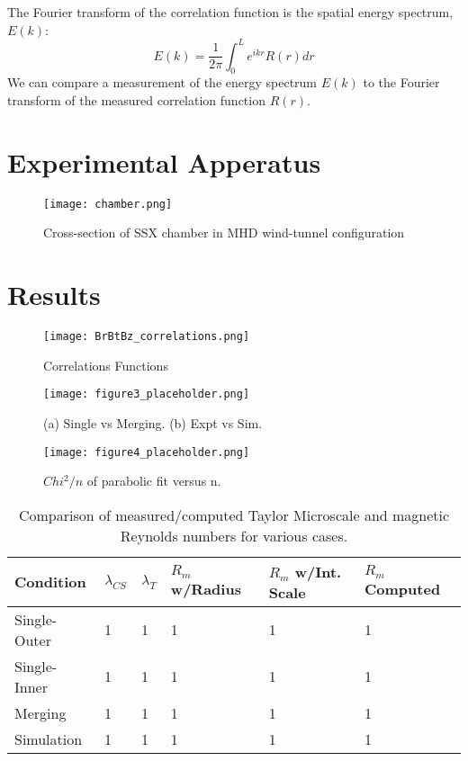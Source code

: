 \documentclass[aip,prl,amsmath,amssymb,reprint,superscriptaddress]{revtex4-1} %
\begin{document}
The Fourier transform of the correlation function is the spatial energy spectrum, $E(k)$:
%
\begin{equation}
E(k) = \frac{1}{2 \pi} \int_0^L e^{ikr} R(r) dr
\label{eq:spectrum1}
\end{equation}
%
We can compare a measurement of the energy spectrum $E(k)$ to the Fourier transform of the measured correlation function $R(r)$.

\section{Experimental Apperatus}

\begin{figure}[!htbp]
\centerline{
\texttt{[image: chamber.png]}}
\caption{\label{fig:chamber} Cross-section of SSX chamber in MHD wind-tunnel configuration}
\end{figure}

\section{Results}

\begin{figure}[!htbp]
\centerline{
\texttt{[image: BrBtBz\_correlations.png]}}
\caption{\label{fig:BrBtBz_correlations} Correlations Functions}
\end{figure}

\begin{figure}[!htbp]
\centerline{
\texttt{[image: figure3\_placeholder.png]}}
\caption{\label{fig:figure3_placeholder} (a) Single vs Merging. (b) Expt vs Sim.}
\end{figure}

\begin{figure}[!htbp]
\centerline{
\texttt{[image: figure4\_placeholder.png]}}
\caption{\label{fig:figure4_placeholder} $Chi^{2}/n$ of parabolic fit versus n.}
\end{figure}

\begin{table}
\caption{\label{tab:Rms}Comparison of measured/computed Taylor Microscale and magnetic Reynolds numbers for various cases.}
\begin{tabular}{|l|l|l|l|l|l|}
\hline
Condition&$\lambda_{CS}$&$\lambda_{T}$&$R_{m}$ w/Radius&$R_{m}$ w/Int. Scale&$R_{m}$ Computed\\
\hline
Single-Outer&1&1&1&1&1\\
Single-Inner&1&1&1&1&1\\
Merging&1&1&1&1&1\\
Simulation&1&1&1&1&1\\
\hline
\end{tabular}
\end{table}
\end{document}

